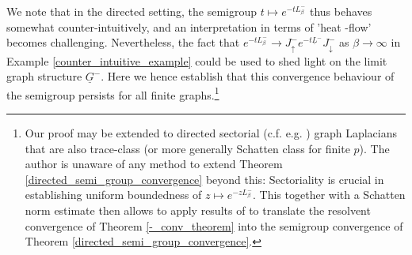 \documentclass[reqno,12pt,letterpaper]{amsart}
\numberwithin{equation}{section}
\newcommand{\Lin}{L^{-}}
\newcommand{\1}{\mathds{1}}
\theoremstyle{definition}
\begin{document}
We note that in the directed setting, the semigroup $t \mapsto e^{-t \Lin_\beta}$ thus behaves somewhat counter-intuitively, and an interpretation in terms of 'heat -flow' becomes challenging. Nevertheless, the fact that $e^{-t\Lin_\beta} \rightarrow J^-_\uparrow  e^{-t\underline{L}^-} J^-_\downarrow$ as $\beta \rightarrow \infty$ in Example \ref{counter_intuitive_example} could be used to shed light on the limit graph structure $\underline{G}^-$. Here we hence establish that this convergence behaviour of the semigroup persists for all finite graphs.\footnote{Our proof may be extended to directed sectorial (c.f. e.g.  \cite{anne2018sectoriality})  graph Laplacians that are also trace-class (or more generally 
Schatten class for finite $p$). 
The author is  
unaware of any
method to extend Theorem \ref{directed_semi_group_convergence} beyond this: Sectoriality is crucial in establishing uniform boundedness of $z \mapsto e^{-z\Lin_\beta} $. This together with a Schatten norm estimate \cite{Bandtlow2003} then allows to apply results of \cite{arendt2001approximation} to translate the resolvent convergence of Theorem \ref{-_conv_theorem} into the semigroup convergence 
of Theorem \ref{directed_semi_group_convergence}. 
}
\end{document}
